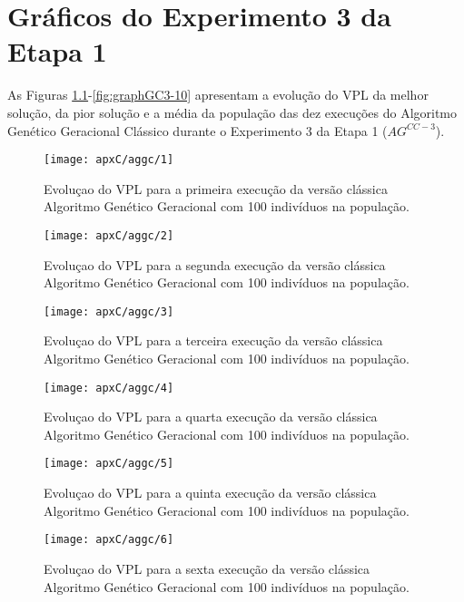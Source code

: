 \chapter{Gráficos do Experimento 3 da Etapa 1}

As Figuras \ref{fig:graphGC3-01}-\ref{fig:graphGC3-10} apresentam a evolução do VPL da melhor solução, da pior solução e a média da população das dez execuções do Algoritmo Genético Geracional Clássico durante o Experimento 3 da Etapa 1 ($AG^{CC-3}$).

\begin{figure}[H]
\centering
\texttt{[image: apxC/aggc/1]}
\caption{Evoluçao do VPL para a primeira execução da versão clássica Algoritmo Genético Geracional com 100 indivíduos na população.}
\label{fig:graphGC3-01}
\end{figure}

\begin{figure}[H]
\centering
\texttt{[image: apxC/aggc/2]}
\caption{Evoluçao do VPL para a segunda execução da versão clássica Algoritmo Genético Geracional com 100 indivíduos na população.}
\label{fig:graphGC3-02}
\end{figure}

\begin{figure}[H]
\centering
\texttt{[image: apxC/aggc/3]}
\caption{Evoluçao do VPL para a terceira execução da versão clássica Algoritmo Genético Geracional com 100 indivíduos na população.}
\label{fig:graphGC3-03}
\end{figure}

\begin{figure}[H]
\centering
\texttt{[image: apxC/aggc/4]}
\caption{Evoluçao do VPL para a quarta execução da versão clássica Algoritmo Genético Geracional com 100 indivíduos na população.}
\label{fig:graphGC3-04}
\end{figure}

\begin{figure}[H]
\centering
\texttt{[image: apxC/aggc/5]}
\caption{Evoluçao do VPL para a quinta execução da versão clássica Algoritmo Genético Geracional com 100 indivíduos na população.}
\label{fig:graphGC3-05}
\end{figure}

\begin{figure}[H]
\centering
\texttt{[image: apxC/aggc/6]}
\caption{Evoluçao do VPL para a sexta execução da versão clássica Algoritmo Genético Geracional com 100 indivíduos na população.}
\label{fig:graphGC3-06}
\end{figure}

